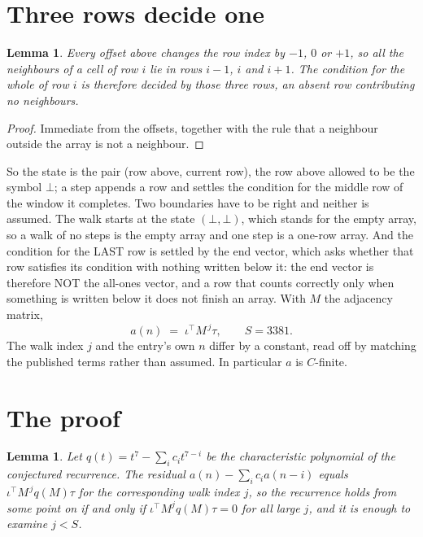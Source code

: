 \documentclass[11pt,a4paper]{article}
\theoremstyle{plain}
\newtheorem{lemma}[theorem]{Lemma}
\theoremstyle{definition}
\begin{document}
\section{Three rows decide one}

\begin{lemma}\label{lem:win}
Every offset above changes the row index by $-1$, $0$ or $+1$, so all the neighbours of a cell
of row $i$ lie in rows $i-1$, $i$ and $i+1$. The condition for the whole of row $i$ is
therefore decided by those three rows, an absent row contributing no neighbours.
\end{lemma}

\begin{proof}
Immediate from the offsets, together with the rule that a neighbour outside the array is not a
neighbour.
\end{proof}

So the state is the pair (row above, current row), the row above allowed to be the symbol
$\bot$; a step appends a row and settles the condition for the middle row of the window it
completes. Two boundaries have to be right and neither is assumed. The walk starts at the state
$(\bot,\bot)$, which stands for the empty array, so a walk of no steps is the empty array and
one step is a one-row array. And the condition for the LAST row is settled by the end vector,
which asks whether that row satisfies its condition with nothing written below it: the end
vector is therefore NOT the all-ones vector, and a row that counts correctly only when
something is written below it does not finish an array. With $M$ the adjacency matrix,
\[
a(n)\;=\;\iota^{\!\top}M^{\,j}\tau ,\qquad S=3381.
\]
The walk index $j$ and the entry's own $n$ differ by a constant, read off by matching the
published terms rather than assumed. In particular $a$ is $C$-finite.

\section{The proof}

\begin{lemma}\label{lem:crit}
Let $q(t)=t^{7}-\sum_i c_it^{7-i}$ be the characteristic polynomial of the
conjectured recurrence. The residual $a(n)-\sum_ic_ia(n-i)$ equals
$\iota^{\!\top}M^{\,j}q(M)\tau$ for the corresponding walk index $j$, so the recurrence
holds from some point on if and only if $\iota^{\!\top}M^{j}q(M)\tau=0$ for all large $j$,
and it is enough to examine $j<S$.
\end{lemma}
\end{document}
